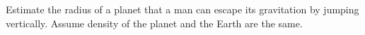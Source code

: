 Estimate the radius of a planet that a man can escape its gravitation by
jumping vertically. Assume density of the planet and the Earth are the same.
